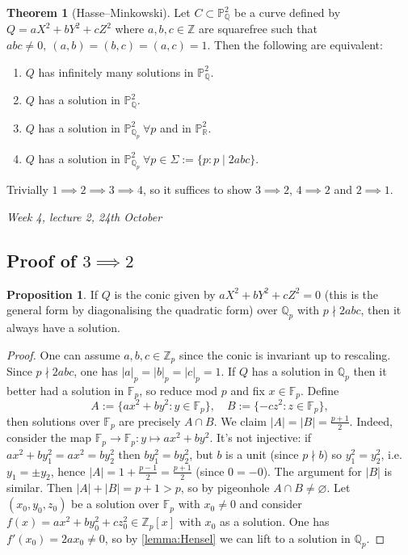 \documentclass{article}
\newcommand{\F}{\mathbb{F}}
\newcommand{\Z}{\mathbb{Z}}
\newcommand{\Q}{\mathbb{Q}}
\newcommand{\R}{\mathbb{R}}
\newcommand{\p}{\mathbb{P}}
\theoremstyle{definition}
\newtheorem{prop}[defn]{Proposition}
\newtheorem{thm}[defn]{Theorem}
\begin{document}
\begin{thm}[Hasse--Minkowski]
\label{thm:HasseMinkowski}
Let $C\subset\p_\Q^2$ be a curve defined by $Q=aX^2+bY^2+cZ^2$ where $a,b,c\in\Z$ are squarefree such that $abc\neq 0,\ (a,b)=(b,c)=(a,c)=1$. Then the following are equivalent:
\begin{enumerate}
\item $Q$ has infinitely many solutions in $\p_\Q^2$.
\item $Q$ has a solution in $\p_\Q^2$.
\item $Q$ has a solution in $\p_{\Q_p}^2 \ \forall p$ and in $\p_\R^2$.
\item $Q$ has a solution in $\p_{\Q_p}^2 \ \forall p\in\Sigma:=\{p:p\mid 2abc\}$.
\end{enumerate}
\end{thm}

Trivially $1\implies 2\implies 3\implies 4$, so it suffices to show $3\implies 2$, $4\implies 2$ and $2\implies 1$.

\begin{flushright}
\textit{Week 4, lecture 2, 24th October}
\end{flushright}

\subsection{Proof of $3\implies 2$}

\begin{prop}
If $Q$ is the conic given by $aX^2+bY^2+cZ^2=0$ (this is the general form by diagonalising the quadratic form) over $\Q_p$ with $p\nmid 2abc$, then it always have a solution.
\end{prop}
\begin{proof}
One can assume $a,b,c\in\Z_p$ since the conic is invariant up to rescaling. Since $p\nmid 2abc$, one has $|a|_p=|b|_p=|c|_p=1$. If $Q$ has a solution in $\Q_p$ then it better had a solution in $\F_p$, so reduce mod $p$ and fix $x\in\F_p$. Define
\[
A:=\{ax^2+by^2:y\in\F_p\},\quad B:=\{-cz^2:z\in\F_p\},
\]
then solutions over $\F_p$ are precisely $A\cap B$. We claim $|A|=|B|=\frac{p+1}{2}$. Indeed, consider the map $\F_p\rightarrow\F_p:y\mapsto ax^2+by^2$. It's not injective: if $ax^2+by_1^2=ax^2=by_2^2$ then $by_1^2=by_2^2$, but $b$ is a unit (since $p\nmid b$) so $y_1^2=y_2^2$, i.e. $y_1=\pm y_2$, hence $|A|=1+\frac{p-1}{2}=\frac{p+1}{2}$ (since $0=-0$). The argument for $|B$| is similar. Then $|A|+|B|=p+1>p$, so by pigeonhole $A\cap B\neq\varnothing$. Let $(x_0,y_0,z_0)$ be a solution over $\F_p$ with $x_0\neq 0$ and consider $f(x)=ax^2+by_0^2+cz_0^2\in\Z_p[x]$ with $x_0$ as a solution. One has $f'(x_0)=2ax_0\neq 0$, so by \ref{lemma:Hensel} we can lift to a solution in $\Q_p$.
\end{proof}
\end{document}
